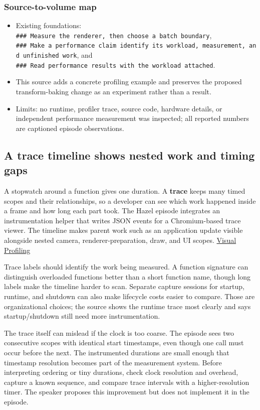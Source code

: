\subsubsection{Source-to-volume map}\label{06-engine-ii-ch041-source-to-volume-map}

\begin{itemize}
\tightlist
\item
  Existing foundations: \texttt{\#\#\#\ Measure\ the\ renderer,\ then\ choose\ a\ batch\ boundary}, \texttt{\#\#\#\ Make\ a\ performance\ claim\ identify\ its\ workload,\ measurement,\ and\ unfinished\ work}, and \texttt{\#\#\#\ Read\ performance\ results\ with\ the\ workload\ attached}.
\item
  This source adds a concrete profiling example and preserves the proposed transform-baking change as an experiment rather than a result.
\item
  Limits: no runtime, profiler trace, source code, hardware details, or independent performance measurement was inspected; all reported numbers are captioned episode observations.
\end{itemize}

\subsection{A trace timeline shows nested work and timing gaps}\label{06-engine-ii-ch041-a-trace-timeline-shows-nested-work-and-timing-gaps}

A stopwatch around a function gives one duration. A \textbf{trace} keeps many timed scopes and their relationships, so a developer can see which work happened inside a frame and how long each part took. The Hazel episode integrates an instrumentation helper that writes JSON events for a Chromium-based trace viewer. The timeline makes parent work such as an application update visible alongside nested camera, renderer-preparation, draw, and UI scopes. \href{https://www.youtube.com/watch?v=qiD39bB7DvA}{Visual Profiling}

Trace labels should identify the work being measured. A function signature can distinguish overloaded functions better than a short function name, though long labels make the timeline harder to scan. Separate capture sessions for startup, runtime, and shutdown can also make lifecycle costs easier to compare. Those are organizational choices; the source shows the runtime trace most clearly and says startup/shutdown still need more instrumentation.

The trace itself can mislead if the clock is too coarse. The episode sees two consecutive scopes with identical start timestamps, even though one call must occur before the next. The instrumented durations are small enough that timestamp resolution becomes part of the measurement system. Before interpreting ordering or tiny durations, check clock resolution and overhead, capture a known sequence, and compare trace intervals with a higher-resolution timer. The speaker proposes this improvement but does not implement it in the episode.

